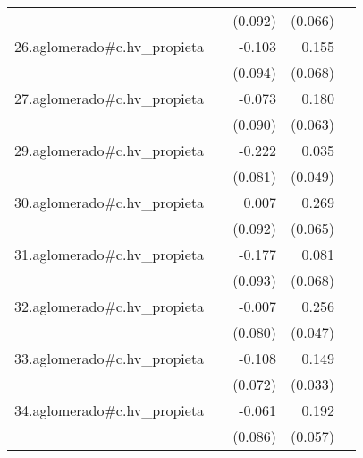 {\begin{longtable}{l*{4}{D{.}{.}{-1}}}
            &                     &     (0.092)         &     (0.066)         &                     \\
\addlinespace
26.aglomerado#c.hv\_propieta&                     &      -0.103         &       0.155\sym{*}  &                     \\
            &                     &     (0.094)         &     (0.068)         &                     \\
\addlinespace
27.aglomerado#c.hv\_propieta&                     &      -0.073         &       0.180\sym{**} &                     \\
            &                     &     (0.090)         &     (0.063)         &                     \\
\addlinespace
29.aglomerado#c.hv\_propieta&                     &      -0.222\sym{**} &       0.035         &                     \\
            &                     &     (0.081)         &     (0.049)         &                     \\
\addlinespace
30.aglomerado#c.hv\_propieta&                     &       0.007         &       0.269\sym{***}&                     \\
            &                     &     (0.092)         &     (0.065)         &                     \\
\addlinespace
31.aglomerado#c.hv\_propieta&                     &      -0.177         &       0.081         &                     \\
            &                     &     (0.093)         &     (0.068)         &                     \\
\addlinespace
32.aglomerado#c.hv\_propieta&                     &      -0.007         &       0.256\sym{***}&                     \\
            &                     &     (0.080)         &     (0.047)         &                     \\
\addlinespace
33.aglomerado#c.hv\_propieta&                     &      -0.108         &       0.149\sym{***}&                     \\
            &                     &     (0.072)         &     (0.033)         &                     \\
\addlinespace
34.aglomerado#c.hv\_propieta&                     &      -0.061         &       0.192\sym{***}&                     \\
            &                     &     (0.086)         &     (0.057)         &                     \\

\end{longtable}}
